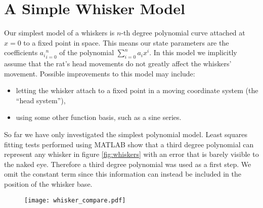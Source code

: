 \section*{A Simple Whisker Model}

Our simplest model of a whiskers is $n$-th degree polynomial curve attached at $x=0$ to a fixed point in space. This means our state parameters are the coefficients ${a_i}_{i=0}^n$ of the polynomial $\sum_{i=0}^n a_ix^i$. In this model we implicitly assume that the rat's head movements do not greatly affect the whiskers' movement. Possible improvements to this model may include:
\begin{itemize}
  \item letting the whisker attach to a fixed point in a moving coordinate system (the ``head system''),
  \item using some other function basis, such as a sine series.
\end{itemize}

So far we have only investigated the simplest polynomial model. Least squares fitting tests performed using MATLAB show that a third degree polynomial can represent any whisker in figure \ref{fig:whiskers} with an error that is barely visible to the naked eye. Therefore a third degree polynomial was used as a first step. We omit the constant term since this information can instead be included in the position of the whisker base.

\begin{figure}
  \centering
  \texttt{[image: whisker\_compare.pdf]}
\end{figure}

